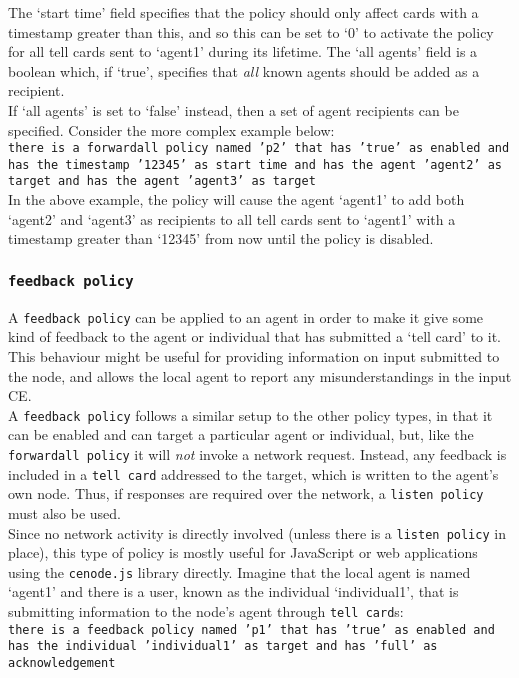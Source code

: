 \documentclass{scrartcl}
\begin{document}
The `start time' field specifies that the policy should only affect cards with a timestamp greater than this, and so this can be set to `0' to activate the policy for all tell cards sent to `agent1' during its lifetime. The `all agents' field is a boolean which, if `true', specifies that \textit{all} known agents should be added as a recipient.\\

If `all agents' is set to `false' instead, then a set of agent recipients can be specified. Consider the more complex example below:\\
\texttt{there is a forwardall policy named 'p2' that has 'true' as enabled and has the timestamp '12345' as start time and has the agent 'agent2' as target and has the agent 'agent3' as target}\\

In the above example, the policy will cause the agent `agent1' to add both `agent2' and `agent3' as recipients to all tell cards sent to `agent1' with a timestamp greater than `12345' from now until the policy is disabled.

\subsubsection{\texttt{feedback policy}}
A \texttt{feedback policy} can be applied to an agent in order to make it give some kind of feedback to the agent or individual that has submitted a `tell card' to it. This behaviour might be useful for providing information on input submitted to the node, and allows the local agent to report any misunderstandings in the input CE.\\

A \texttt{feedback policy} follows a similar setup to the other policy types, in that it can be enabled and can target a particular agent or individual, but, like the \texttt{forwardall policy} it will \textit{not} invoke a network request. Instead, any feedback is included in a \texttt{tell card} addressed to the target, which is written to the agent's own node. Thus, if responses are required over the network, a \texttt{listen policy} must also be used.\\

Since no network activity is directly involved (unless there is a \texttt{listen policy} in place), this type of policy is mostly useful for JavaScript or web applications using the \texttt{cenode.js} library directly. Imagine that the local agent is named `agent1' and there is a user, known as the individual `individual1', that is submitting information to the node's agent through \texttt{tell card}s:\\
\texttt{there is a feedback policy named 'p1' that has 'true' as enabled and has the individual 'individual1' as target and has 'full' as acknowledgement}\\
\end{document}
